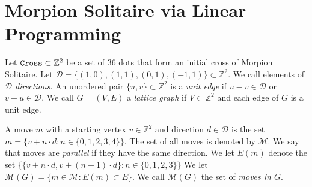 
\newcommand{\D}{\mathcal{D}}

\section{Morpion Solitaire via Linear Programming}
\label{sec:linear}

Let $\texttt{Cross} \subset \mathbb{Z}^2$ be a set of $36$ dots that form an initial cross of Morpion Solitaire.
Let $\D = \{ (1, 0), (1,1), (0,1), (-1,1) \} \subset \mathbb{Z}^2$. We call elements of $\D$ \emph{directions}.
An unordered pair $\{ u, v \} \subset \mathbb{Z}^2$ is a \emph{unit edge} if $u - v \in \D$ or $v - u \in \D$.
We call $G = (V, E)$  a \emph{lattice graph} if $V \subset \mathbb{Z}^2$
      and each edge of $G$ is a unit edge.




A move $m$ with a starting vertex $v \in \mathbb{Z}^2$ and direction $d \in \D$ is the set
$
   m = \{ v + n \cdot d \colon n \in \{ 0, 1, 2, 3, 4 \} \}.
$
The set of all moves is denoted by $\mathcal{M}$.
We say that moves are \emph{parallel} if they have the same direction.
We let $E(m)$ denote the set $\{ \{ v + n \cdot d, v + (n+1) \cdot d \} \colon n \in \{0, 1, 2, 3 \} \}$
    We let
    $
      \mathcal{M}(G) = \{ m \in \mathcal{M} \colon E(m) \subset E \}
    $.
     We call $\mathcal{M}(G)$ the set of \emph{moves in $G$}.


